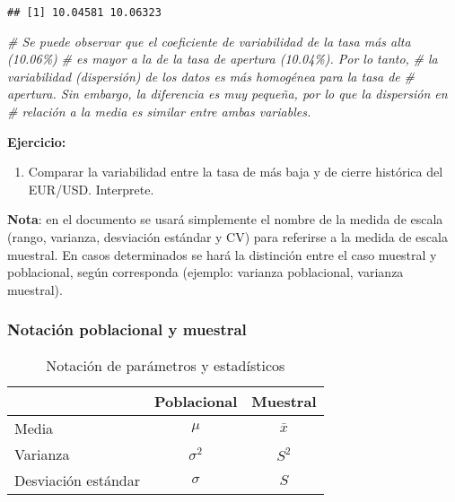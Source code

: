 \documentclass[
]{book}
\newenvironment{Shaded}{\begin{snugshade}}{\end{snugshade}}
\newcommand{\CommentTok}[1]{\textcolor[rgb]{0.56,0.35,0.01}{\textit{#1}}}
\providecommand{\tightlist}{%
  \setlength{\itemsep}{0pt}\setlength{\parskip}{0pt}}
\begin{document}
\begin{verbatim}
## [1] 10.04581 10.06323
\end{verbatim}

\begin{Shaded}
\begin{Highlighting}[]
\CommentTok{\# Se puede observar que el coeficiente de variabilidad de la tasa más alta (10.06\%)}
\CommentTok{\# es mayor a la de la tasa de apertura (10.04\%). Por lo tanto, }
\CommentTok{\# la variabilidad (dispersión) de los datos es más homogénea para la tasa de}
\CommentTok{\# apertura. Sin embargo, la diferencia es muy pequeña, por lo que la dispersión en }
\CommentTok{\# relación a la media es similar entre ambas variables.}
\end{Highlighting}
\end{Shaded}

\textbf{Ejercicio:}

\begin{enumerate}
\def\labelenumi{\arabic{enumi}.}
\tightlist
\item
  Comparar la variabilidad entre la tasa de más baja y de cierre histórica del EUR/USD. Interprete.
\end{enumerate}

\textbf{Nota}: en el documento se usará simplemente el nombre de la medida de escala (rango, varianza, desviación estándar y CV) para referirse a la medida de escala muestral. En casos determinados se hará la distinción entre el caso muestral y poblacional, según corresponda (ejemplo: varianza poblacional, varianza muestral).

\hypertarget{notaciuxf3n-poblacional-y-muestral}{%
\subsubsection*{Notación poblacional y muestral}\label{notaciuxf3n-poblacional-y-muestral}}

\begin{table}

\caption{\label{tab:notacion}Notación de parámetros y estadísticos}
\centering
\begin{tabular}[t]{lcc}
\toprule
  & Poblacional & Muestral\\
\midrule
Media & $\mu$ & $\bar{x}$\\
Varianza & $\sigma^2$ & $S^2$\\
Desviación estándar & $\sigma$ & $S$\\
\bottomrule
\end{tabular}
\end{table}
\end{document}
